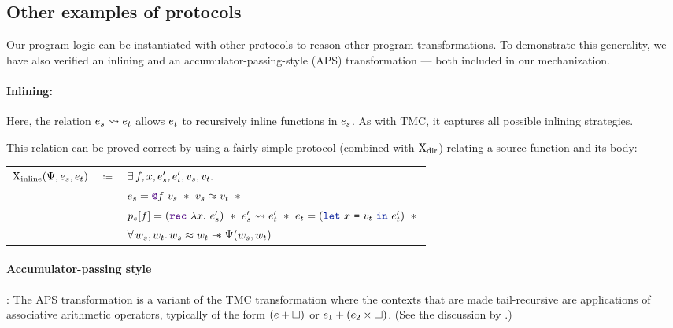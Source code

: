\subsection{Other examples of protocols}

Our program logic can be instantiated with other protocols to reason other program transformations.
To demonstrate this generality, we have also verified an inlining and an accumulator-passing-style (APS) transformation --- both included in our mechanization.

\paragraph{Inlining:} Here, the relation $\datalangExpr_s \rightsquigarrow \datalangExpr_t$ allows $\datalangExpr_t$ to recursively inline functions in $\datalangExpr_s$.
As with TMC, it captures all possible inlining strategies.

This relation can be proved correct by using a fairly simple protocol (combined with $\mathrm{X}_\mathrm{dir}$) relating a source function and its body:

\begin{tabular}{rcl}
        $\iProt_\mathrm{inline} (\iPredTwo, \datalangExpr_s, \datalangExpr_t)$
        & $\coloneqq$ &
        $\exists \datalangFn, \datalangVar, \datalangExpr_s', \datalangExpr_t', \datalangVal_s, \datalangVal_t \ldotp$
    \\
        &&
        $
        \datalangExpr_s = \datalangCall{\datalangFnptr{\datalangFn}}{\datalangVal_s}
        \ \iSep\ %
        \datalangVal_s \iSimilar \datalangVal_t
        \ \iSep {}$
    \\
        &&
        $\datalangProg_s [\datalangFn] = (\datalangRec{\datalangVar}{\datalangExpr_s'})
        \ \iSep\ %
        \datalangExpr_s' \rightsquigarrow \datalangExpr_t'
        \ \iSep\ %
        \datalangExpr_t = (\datalangLet{\datalangVar}{\datalangVal_t}{\datalangExpr_t'})
        \ \iSep {}$
    \\
        &&
        $\forall \datalangValTwo_s, \datalangValTwo_t \ldotp
        \datalangValTwo_s \iSimilar \datalangValTwo_t \iWand
        \iPredTwo (\datalangValTwo_s, \datalangValTwo_t)$
\end{tabular}
\medskip

\paragraph{Accumulator-passing style}: The APS transformation is a variant of the TMC transformation where the contexts that are made tail-recursive are applications of associative arithmetic operators, typically of the form $(\datalangExpr + \datalangCtxHole)$ or $\datalangExpr_1 + (\datalangExpr_2 \times \datalangCtxHole)$. (See the discussion by \citet*{tmc-koka-2023}.)

